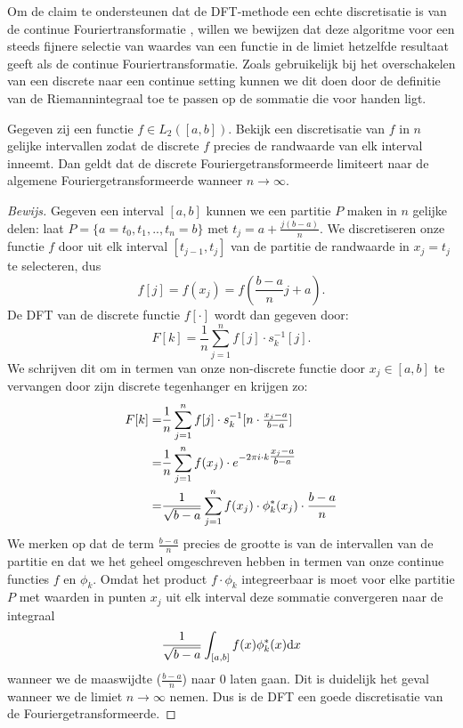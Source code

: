 Om de claim te ondersteunen dat de DFT-methode een echte discretisatie is van de continue Fouriertransformatie ,
willen we bewijzen dat deze algoritme voor een steeds fijnere selectie van waardes van een functie in de 
limiet hetzelfde resultaat geeft als de continue Fouriertransformatie. 
Zoals gebruikelijk bij het overschakelen van een discrete naar een continue setting kunnen we dit doen 
door de definitie van de Riemannintegraal toe te passen op de sommatie die voor handen ligt.

\begin{stelling}
  Gegeven zij een functie $f\in L_2([a,b])$. Bekijk een discretisatie van $f$ in $n$ gelijke intervallen zodat de discrete $f$ precies 
  de randwaarde van elk interval inneemt.
  Dan geldt dat de discrete Fouriergetransformeerde limiteert naar de algemene Fouriergetransformeerde wanneer $n\to\infty$.
\end{stelling} 
\begin{proof}[Bewijs]
Gegeven een interval $[a,b]$ kunnen we een partitie $P$ maken in $n$ gelijke delen: laat $P=\{a=t_0,t_1,..,t_n=b\}$ met $t_j = a+\tfrac{j(b-a)}{n}$.
We discretiseren onze functie $f$ door uit elk interval $[t_{j-1},t_{j}]$ van de partitie de randwaarde in 
$x_j = t_j$ te selecteren, dus
\[
f[j] = f(x_j) = f(\frac{b-a}{n}j + a).
\]
De DFT van de discrete functie $f[\cdot]$ wordt dan gegeven door:
\[
F[k] = \frac1n\sum_{j=1}^n f[j] \cdot s_k^{-1}[j].
\]
We schrijven dit om in termen van onze non-discrete functie door $x_j\in[a,b]$ 
te vervangen door zijn discrete tegenhanger en krijgen zo:
\begin{eqnarray*}
  F[k] =& \frac{1}{n} \sum_{j=1}^n f[j]\cdot s_k^{-1}[n\cdot\tfrac{x_j-a}{b-a}] \\
       =& \frac{1}{n} \sum_{j=1}^n f(x_j)\cdot e^{-{2\pi i} \cdot k \tfrac{x_j-a}{b-a}}\\
       =&  \frac{1}{\sqrt{b-a}}\sum_{j=1}^n f(x_j)\cdot \phi^*_k(x_j) \cdot\frac{b-a}{n} 
\end{eqnarray*}
We merken op dat de term $\frac{b-a}{n}$ precies de grootte is van de intervallen van de partitie 
en dat we het geheel omgeschreven hebben in termen van onze continue functies $f$ en $\phi_k$.
Omdat het product $f\cdot\phi_k$ integreerbaar is moet voor elke partitie $P$ met 
waarden in punten $x_j$ uit elk interval deze sommatie convergeren naar de integraal
\[
  \frac{1}{\sqrt{b-a}} \int_{[a,b]} f(x) \phi^*_k(x) {\mathrm{d} x}
\]
wanneer we de maaswijdte ($\tfrac{b-a}{n}$) naar $0$ laten gaan. \cite{shilov}
Dit is duidelijk het geval wanneer we de limiet $n\to\infty$ nemen. 
Dus is de DFT een goede discretisatie van de Fouriergetransformeerde. 
\end{proof}

